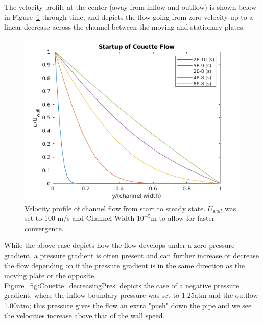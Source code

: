 \documentclass[10pt,a4paper]{article}
\begin{document}
The velocity profile at the center (away from inflow and outflow) is shown below in Figure~\ref{fig:CouetteFlowStartup} through time, and depicts the flow going from zero velocity up to a linear decrease across the channel between the moving and stationary plates.\\



\FloatBarrier

\begin{figure}[!htb]
	\begin{center}
		\includegraphics[scale=0.7]{images/FlowStartup.png} 
		\caption{Velocity profile of channel flow from start to steady state. $U_{wall}$ was set to 100 m/s and Channel Width $10^{-5}$m to allow for faster convergence.}
		\label{fig:CouetteFlowStartup}
	\end{center}
\end{figure}


\FloatBarrier


While the above case depicts how the flow develops under a zero pressure gradient, a pressure gradient is often present and can further increase or decrease the flow depending on if the pressure gradient is in the same direction as the moving plate or the opposite.\\

Figure~\ref{fig:Couette_decreasingPres} depicts the case of a negative pressure gradient, where the inflow boundary pressure was set to 1.25atm and the outflow 1.00atm; this pressure gives the flow an extra "push" down the pipe and we see the velocities increase above that of the wall speed. \\
\end{document}
